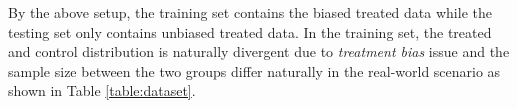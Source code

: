 \documentclass[sigconf]{acmart}
\begin{document}
By the above setup, the training set contains the biased treated data while the testing set only contains unbiased treated data. In the training set, the treated and control distribution is naturally divergent due to \textit{treatment bias} issue and the sample size between the two groups differ naturally in the real-world scenario as shown in Table \ref{table:dataset}.
\end{document}
